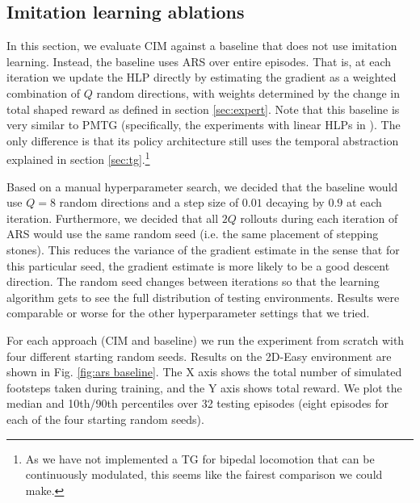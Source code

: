 \documentclass[conference]{IEEEtran}
\begin{document}

\subsection{Imitation learning ablations}

In this section, we evaluate CIM against a baseline that does not use imitation learning.
Instead, the baseline uses ARS \citep{mania2018simple} over entire episodes.
That is, at each iteration we update the HLP directly by estimating the gradient as a weighted combination of $Q$ random directions,
with weights determined by the change in total shaped reward as defined in section \ref{sec:expert}.
Note that this baseline is very similar to PMTG (specifically, the experiments with linear HLPs in \citet{iscen2018pmtg}).
The only difference is that its policy architecture still uses the temporal abstraction explained in section \ref{sec:tg}.\footnote{
As we have not implemented a TG for bipedal locomotion that can be continuously modulated, this seems like the fairest comparison we could make.}

Based on a manual hyperparameter search, we decided that the baseline would use $Q=8$ random directions and a step size of $0.01$ decaying by $0.9$ at each iteration.
Furthermore, we decided that all $2Q$ rollouts during each iteration of ARS would use the same random seed (i.e. the same placement of stepping stones).
This reduces the variance of the gradient estimate in the sense that for this particular seed, the gradient estimate is more likely to be a good descent direction.
The random seed changes between iterations so that the learning algorithm gets to see the full distribution of testing environments.
Results were comparable or worse for the other hyperparameter settings that we tried.

For each approach (CIM and baseline) we run the experiment from scratch with four different starting random seeds.
Results on the 2D-Easy environment are shown in Fig. \ref{fig:ars baseline}.
The X axis shows the total number of simulated footsteps taken during training, and the Y axis shows total reward.
We plot the median and 10th/90th percentiles over 32 testing episodes (eight episodes for each of the four starting random seeds).
\end{document}
